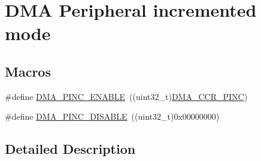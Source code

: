 \hypertarget{group___d_m_a___peripheral__incremented__mode}{\section{D\-M\-A Peripheral incremented mode}
\label{group___d_m_a___peripheral__incremented__mode}
}
\subsection*{Macros}
\begin{DoxyCompactItemize}
\item 
\#define \hyperlink{group___d_m_a___peripheral__incremented__mode_gab6d84e5805302516d26c06fb4497a346}{D\-M\-A\-\_\-\-P\-I\-N\-C\-\_\-\-E\-N\-A\-B\-L\-E}~((uint32\-\_\-t)\hyperlink{group___peripheral___registers___bits___definition_ga028cb96357bd24868a74ee1134a35b7e}{D\-M\-A\-\_\-\-C\-C\-R\-\_\-\-P\-I\-N\-C})
\item 
\#define \hyperlink{group___d_m_a___peripheral__incremented__mode_ga63e2aff2973d1a8f01d5d7b6e4894f39}{D\-M\-A\-\_\-\-P\-I\-N\-C\-\_\-\-D\-I\-S\-A\-B\-L\-E}~((uint32\-\_\-t)0x00000000)
\end{DoxyCompactItemize}


\subsection{Detailed Description}


